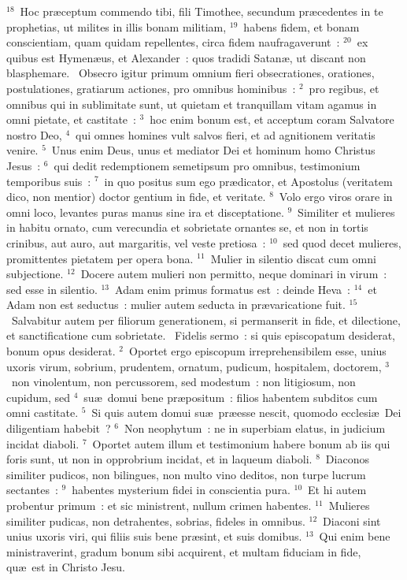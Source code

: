 ${}^{18}$~Hoc pr\ae ceptum commendo tibi, fili Timothee, secundum pr\ae cedentes in te prophetias, ut milites in illis bonam militiam,
${}^{19}$~habens fidem, et bonam conscientiam, quam quidam repellentes, circa fidem naufragaverunt~:
${}^{20}$~ex quibus est Hymen\ae us, et Alexander~: quos tradidi Satan\ae , ut discant non blasphemare.
~Obsecro igitur primum omnium fieri obsecrationes, orationes, postulationes, gratiarum actiones, pro omnibus hominibus~:
${}^{2}$~pro regibus, et omnibus qui in sublimitate sunt, ut quietam et tranquillam vitam agamus in omni pietate, et castitate~:
${}^{3}$~hoc enim bonum est, et acceptum coram Salvatore nostro Deo,
${}^{4}$~qui omnes homines vult salvos fieri, et ad agnitionem veritatis venire.
${}^{5}$~Unus enim Deus, unus et mediator Dei et hominum homo Christus Jesus~:
${}^{6}$~qui dedit redemptionem semetipsum pro omnibus, testimonium temporibus suis~:
${}^{7}$~in quo positus sum ego pr\ae dicator, et Apostolus (veritatem dico, non mentior) doctor gentium in fide, et veritate.
${}^{8}$~Volo ergo viros orare in omni loco, levantes puras manus sine ira et disceptatione.
${}^{9}$~Similiter et mulieres in habitu ornato, cum verecundia et sobrietate ornantes se, et non in tortis crinibus, aut auro, aut margaritis, vel veste pretiosa~:
${}^{10}$~sed quod decet mulieres, promittentes pietatem per opera bona.
${}^{11}$~Mulier in silentio discat cum omni subjectione.
${}^{12}$~Docere autem mulieri non permitto, neque dominari in virum~: sed esse in silentio.
${}^{13}$~Adam enim primus formatus est~: deinde Heva~:
${}^{14}$~et Adam non est seductus~: mulier autem seducta in pr\ae varicatione fuit.
${}^{15}$~Salvabitur autem per filiorum generationem, si permanserit in fide, et dilectione, et sanctificatione cum sobrietate.
~Fidelis sermo~: si quis episcopatum desiderat, bonum opus desiderat.
${}^{2}$~Oportet ergo episcopum irreprehensibilem esse, unius uxoris virum, sobrium, prudentem, ornatum, pudicum, hospitalem, doctorem,
${}^{3}$~non vinolentum, non percussorem, sed modestum~: non litigiosum, non cupidum, sed
${}^{4}$~su\ae\ domui bene pr\ae positum~: filios habentem subditos cum omni castitate.
${}^{5}$~Si quis autem domui su\ae\ pr\ae esse nescit, quomodo ecclesi\ae\ Dei diligentiam habebit~?
${}^{6}$~Non neophytum~: ne in superbiam elatus, in judicium incidat diaboli.
${}^{7}$~Oportet autem illum et testimonium habere bonum ab iis qui foris sunt, ut non in opprobrium incidat, et in laqueum diaboli.
${}^{8}$~Diaconos similiter pudicos, non bilingues, non multo vino deditos, non turpe lucrum sectantes~:
${}^{9}$~habentes mysterium fidei in conscientia pura.
${}^{10}$~Et hi autem probentur primum~: et sic ministrent, nullum crimen habentes.
${}^{11}$~Mulieres similiter pudicas, non detrahentes, sobrias, fideles in omnibus.
${}^{12}$~Diaconi sint unius uxoris viri, qui filiis suis bene pr\ae sint, et suis domibus.
${}^{13}$~Qui enim bene ministraverint, gradum bonum sibi acquirent, et multam fiduciam in fide, qu\ae\ est in Christo Jesu.


